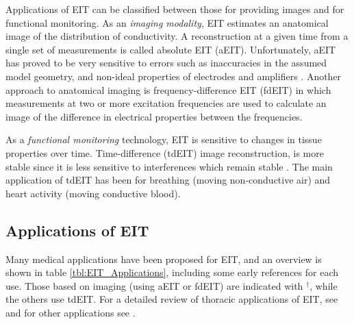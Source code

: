 \documentclass[10pt,journal]{IEEEtran}\def\TBLWIDA{15mm}\def\TBLWIDB{60mm}
\begin{document}
Applications of EIT can be classified between those for
providing images and for functional monitoring.
As an {\em imaging modality}, EIT estimates an anatomical
image of the distribution of conductivity. A reconstruction
at a given time from a single
set of measurements is called absolute EIT (aEIT). Unfortunately,
aEIT has proved to be very sensitive to errors
such as inaccuracies in the assumed
model geometry, and non-ideal properties of electrodes
and amplifiers
 \cite{Adler2015Hard, Nissinen2009Errors}.
Another approach to anatomical imaging is frequency-difference
EIT (fdEIT) in which measurements at two or more excitation frequencies
are used to calculate an image of the difference
in electrical properties between the frequencies.

As a {\em functional monitoring} technology, EIT is sensitive
to changes in tissue properties over time.
Time-difference (tdEIT) image reconstruction, 
is more stable
since it is less sensitive to 
interferences
which remain stable \cite{Brown2003EIT}.
The main application of tdEIT 
has been for breathing (moving non-conductive
air) and heart activity (moving conductive blood).

\subsection{Applications of EIT}


Many medical applications have been proposed for EIT, and an
overview is shown in table \ref{tbl:EIT_Applications},
 including some early references for each use. 
Those based on imaging (using aEIT or fdEIT) are indicated with $^\dagger$, while
the others use tdEIT.
For a detailed review of thoracic applications of EIT, see \cite{Frerichs2017Chest} and
for other applications see \cite{Holder2004Book}.
\end{document}
